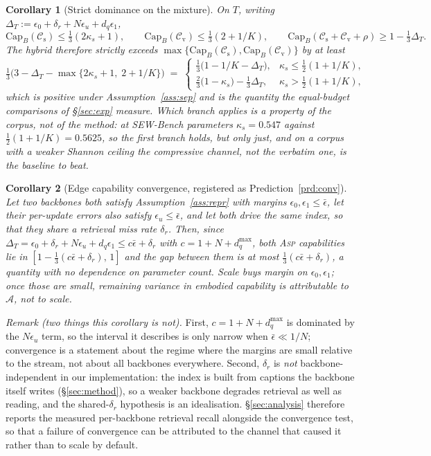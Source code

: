 \documentclass[10pt]{article}
\newtheorem{corollary}{Corollary}
\theoremstyle{definition}
\theoremstyle{plain}
\newcommand{\ASP}{\textsc{Asp}}
\renewcommand{\Cap}{\mathrm{Cap}}
\newcommand{\cs}{\mathcal{C}_{\mathrm{s}}}
\newcommand{\cv}{\mathcal{C}_{\mathrm{v}}}
\newcommand{\A}{\mathcal{A}}
\begin{document}
\begin{corollary}[Strict dominance on the mixture]
\label{cor:dominance}
On $T$, writing $\Delta_T:=\epsilon_0+\delta_r+N\epsilon_u+d_q\epsilon_1$,
\[
\Cap_B(\cs)\le\tfrac13(2\kappa_s+1),\qquad
\Cap_B(\cv)\le\tfrac13(2+1/K),\qquad
\Cap_B(\cs{+}\cv{+}\rho)\ge 1-\tfrac13\Delta_T .
\]
The hybrid therefore strictly exceeds $\max\{\Cap_B(\cs),\Cap_B(\cv)\}$ by at least
\[
\tfrac13\bigl(3-\Delta_T-\max\{2\kappa_s+1,\;2+1/K\}\bigr)
\;=\;\begin{cases}
\tfrac13\bigl(1-1/K-\Delta_T\bigr), & \kappa_s\le\tfrac12(1+1/K),\\[2pt]
\tfrac23\bigl(1-\kappa_s\bigr)-\tfrac13\Delta_T, & \kappa_s>\tfrac12(1+1/K),
\end{cases}
\]
which is positive under Assumption~\ref{ass:sep} and is the quantity the equal-budget comparisons of \S\ref{sec:exp} measure. Which branch applies is a property of the corpus, not of the method: at SEW-Bench parameters $\kappa_s=0.547$ against $\tfrac12(1+1/K)=0.5625$, so the first branch holds, but only just, and on a corpus with a weaker Shannon ceiling the compressive channel, not the verbatim one, is the baseline to beat.
\end{corollary}

\begin{corollary}[Edge capability convergence, registered as Prediction~\ref{prd:conv}]
\label{cor:conv}
Let two backbones both satisfy Assumption~\ref{ass:repr} with margins $\epsilon_0,\epsilon_1\le\bar\epsilon$, let their per-update errors also satisfy $\epsilon_u\le\bar\epsilon$, and let both drive the same index, so that they share a retrieval miss rate $\delta_r$. Then, since $\Delta_T=\epsilon_0+\delta_r+N\epsilon_u+d_q\epsilon_1\le c\bar\epsilon+\delta_r$ with $c=1+N+d_q^{\max}$, both \ASP{} capabilities lie in $[1-\tfrac13(c\bar\epsilon+\delta_r),\,1]$ and the gap between them is at most $\tfrac13(c\bar\epsilon+\delta_r)$, a quantity with no dependence on parameter count. Scale buys margin on $\epsilon_0,\epsilon_1$; once those are small, remaining variance in embodied capability is attributable to $\A$, not to scale.
\end{corollary}

\emph{Remark (two things this corollary is not).} First, $c=1+N+d_q^{\max}$ is dominated by the $N\epsilon_u$ term, so the interval it describes is only narrow when $\bar\epsilon\ll1/N$; convergence is a statement about the regime where the margins are small relative to the stream, not about all backbones everywhere. Second, $\delta_r$ is \emph{not} backbone-independent in our implementation: the index is built from captions the backbone itself writes (\S\ref{sec:method}), so a weaker backbone degrades retrieval as well as reading, and the shared-$\delta_r$ hypothesis is an idealisation. \S\ref{sec:analysis} therefore reports the measured per-backbone retrieval recall alongside the convergence test, so that a failure of convergence can be attributed to the channel that caused it rather than to scale by default.
\end{document}

